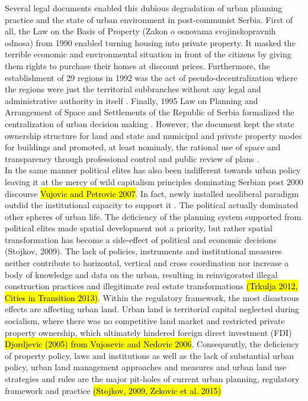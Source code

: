 \documentclass[11pt]{report}
\begin{document}
Several legal documents enabled this dubious degradation of urban planning practice and the state of urban environment in post-communist Serbia.
First of all, the Law on the Basis of Property (Zakon o osnovama svojinskopravnih odnosa) from 1990 enabled turning housing into private property. It masked the terrible economic and environmental situation in front of the citizens by giving them rights to purchase their homes at discount prices. 
Furthermore, the establishment of 29 regions in 1992 was the act of pseudo-decentralization where the regions were just the territorial subbranches without any legal and administrative authority in itself \cite{Vujosevic 2015 Regionalizam u Srbiji 2}.
Finally, 1995 Law on Planning and Arrangement of Space and Settlements of the Republic of Serbia formalized the centralization of urban decision making \cite{Mornings after Nedovic Budic}. However, the document kept the state ownership structure for land and state and municipal and private property modes for buildings and promoted, at least nominaly, the rational use of space and transparency through professional control and public review of plans \cite{adjustment of planning practice nedovic budic 2001}.
\\      
In the same manner political elites has also been indifferent towards urban policy leaving it at the mercy of wild capitalism principles dominating Serbian post 2000 discourse \hl{Vujovic and Petrovic 2007}.
In fact, newly installed neoliberal paradigm outdid the institutional capacity to support it \cite{Peric 2016}.
The political actually dominated other spheres of urban life. The deficiency of the planning system supported from political elites made spatial development not a priority, but rather spatial transformation has become a side-effect of political and economic decisions (Stojkov, 2009). 
The lack of policies, instruments and institutional measures neither contribute to horizontal, vertical and cross coordination nor increase a body of knowledge and data on the urban, resulting in reinvigorated illegal construction practices and illegitimate real estate transformations \hl{(Trkulja 2012, Cities in Transition 2013)}.
Within the regulatory framework, the most disastrous effects are affecting urban land. Urban land is territorial capital neglected during socialism, where there was no competitive land market and restricted private property ownership, which ultimately hindered foreign direct investment (FDI) \hl{Djordjevic (2005) from Vujosevic and Nedovic 2006}.
Consequently, the deficiency of property policy, laws and institutions as well as the lack of substantial urban policy, urban land management approaches and measures and urban land use strategies and rules are the major pit-holes of current urban planning, regulatory framework and practice \hl{(Stojkov, 2009, Zekovic et al. 2015)} 
\end{document}
